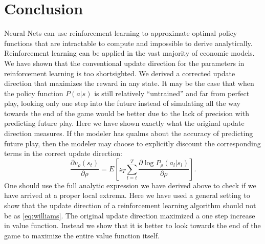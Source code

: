 \documentclass[11pt]{article}
\begin{document}
\section{Conclusion}
Neural Nets can use reinforcement learning to approximate optimal policy functions that are
intractable to compute and impossible to derive analytically.
Reinforcement learning can be
applied in the vast majority of economic models. We have shown that the conventional update
direction for the parameters in reinforcement learning is too shortsighted. We derived a corrected
update direction that maximizes the reward in any state.
It may be the case that when the policy function $P(a|s)$ is still relatively ``untrained'' and
far from perfect play, looking only one step into the future instead of simulating all the way
towards the end of the game would be better due to the lack of precision with predicting future
play. Here we have shown exactly what the original update direction measures. If the modeler has
qualms about the accuracy of predicting future play, then the modeler may choose to explicitly
discount the corresponding terms in the correct update direction:
\[
\frac{\partial v_\rho(s_t)}{\partial \rho}=E\!\left[z_T\sum_{l=t}^T\frac{\partial\log P_\rho(a_l|s_l)}{\partial \rho}\right].
\]
One should use the full analytic expression we have derived above to check if we have arrived at a
proper local extrema.
Here we have used a general setting to show that the update direction of a reinforcement
learning algorithm should not be as \eqref{eq:williams}. The original update direction
maximized a one step increase in value function.
Instead we show that it is better to look
towards the end of the game to maximize the entire value function itself.
\end{document}
